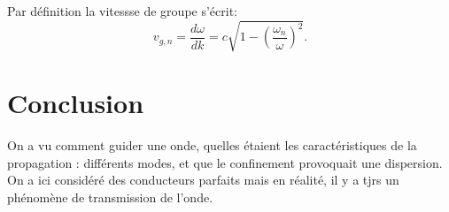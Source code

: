 \documentclass[french, a4paper, 10pt, twocolumn, landscape]{article}
\begin{document}
Par définition la vitessse de groupe s'écrit:
\begin{equation}
	v_{g,n}=\frac{d\omega}{dk} = c\sqrt{1-\left(\frac{\omega_n}{\omega}\right)^2}.
\end{equation}

\section*{Conclusion}

On a vu comment guider une onde, quelles étaient les caractéristiques de la propagation : différents modes, et que le confinement provoquait une dispersion. On a ici considéré des conducteurs parfaits mais en réalité, il y a tjrs un phénomène de transmission de l’onde.

\clearpage 
\end{document}
